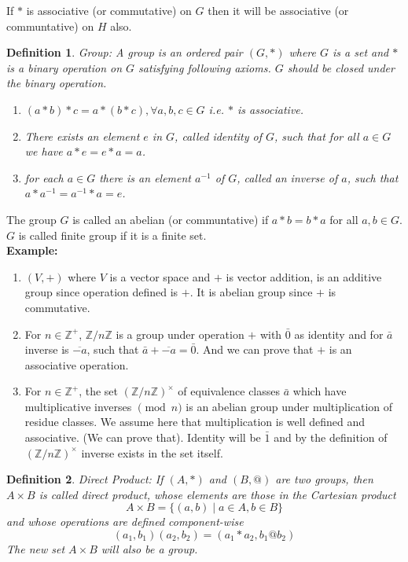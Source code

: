 \documentclass[12pt]{report}
\newtheorem{defn}{Definition}
\begin{document}
If $*$ is associative (or commutative) on $G$ then it will be associative (or communtative) on $H$ also.
\begin{defn}
    Group: A group is an ordered pair $(G, *)$ where $G$ is a set and $*$ is a binary operation on $G$ satisfying following axioms. $G$ should be closed under the binary operation.
    \begin{enumerate}
        \item $(a*b)*c = a*(b*c), \forall a,b,c \in G$ i.e. $*$ is associative.
        \item There exists an element $e$ in $G$, called identity of $G$, such that for all $a \in G$ we have $a*e = e*a = a$.
        \item for each $a \in G$ there is an element $a^{-1}$ of $G$, called an inverse of $a$, such that $a * a^{-1} = a^{-1} * a = e$.
    \end{enumerate}
\end{defn}
The group $G$ is called an abelian (or communtative) if $a*b = b*a$ for all $a,b \in G$.
$G$ is called finite group if it is a finite set.\\
\textbf{Example: }
\begin{enumerate}
    \item $(V, +)$ where $V$ is a vector space and $+$ is vector addition, is an additive group since operation defined is $+$. It is abelian group since $+$ is commutative.
    \item For $n \in \mathbb{Z}^+$, $\mathbb{Z}/n\mathbb{Z}$ is a group under operation $+$ with $\bar{0}$ as identity and for $\bar{a}$ inverse is $\overline{-a}$, such that $\bar{a} + \overline{-a} = \bar{0}$. And we can prove that $+$ is an associative operation.
    \item For $n \in \mathbb{Z}^+$, the set $(\mathbb{Z}/n\mathbb{Z})^{\times}$ of equivalence classes $\bar{a}$ which have multiplicative inverses $\pmod n$ is an abelian group under multiplication of residue classes. We assume here that multiplication is well defined and associative. (We can prove that). Identity will be $\bar{1}$ and by the definition of $(\mathbb{Z}/n\mathbb{Z})^{\times}$ inverse exists in the set itself.
\end{enumerate}
\begin{defn}
    Direct Product: If $(A, *)$ and $(B, @)$ are two groups, then $A \times B$ is called direct product, whose elements are those in the Cartesian product
    $$ A \times B = \{(a,b) \mid a \in A, b \in B\}$$
    and whose operations are defined component-wise
    $$ (a_1, b_1)(a_2, b_2) =(a_1 * a_2, b_1 @ b_2)$$ The new set $A \times B$ will also be a group. 
\end{defn}
\end{document}
